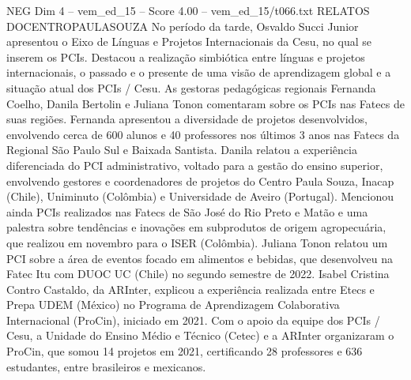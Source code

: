 \begin{textsample}{NEG Dim 4 – vem\_ed\_15 – Score 4.00 – vem\_ed\_15/t066.txt}  \label{ex:f4_neg_054}
RELATOS DOCENTROPAULASOUZA No período da tarde, Osvaldo Succi Junior apresentou o Eixo de Línguas e Projetos Internacionais da Cesu, no qual se inserem os PCIs.
Destacou a realização simbiótica entre línguas e projetos internacionais, o passado e o presente de uma visão de aprendizagem global e a situação atual dos PCIs / Cesu.
As gestoras pedagógicas regionais Fernanda Coelho, Danila Bertolin e Juliana Tonon comentaram sobre os PCIs nas Fatecs de suas regiões.
Fernanda apresentou a diversidade de projetos desenvolvidos, envolvendo cerca de 600 alunos e 40 professores nos últimos 3 anos nas Fatecs da Regional São Paulo Sul e Baixada Santista.
Danila relatou a experiência diferenciada do PCI administrativo, voltado para a gestão do ensino superior, envolvendo gestores e coordenadores de projetos do Centro Paula Souza, Inacap (Chile), Uniminuto (Colômbia) e Universidade de Aveiro (Portugal).
Mencionou ainda PCIs realizados nas Fatecs de São José do Rio Preto e Matão e uma palestra sobre tendências e inovações em subprodutos de origem agropecuária, que realizou em novembro para o ISER (Colômbia).
Juliana Tonon relatou um PCI sobre a área de eventos focado em alimentos e bebidas, que desenvolveu na Fatec Itu com DUOC UC (Chile) no segundo semestre de 2022.
Isabel Cristina Contro Castaldo, da ARInter, explicou a experiência realizada entre Etecs e Prepa UDEM (México) no Programa de Aprendizagem Colaborativa Internacional (ProCin), iniciado em 2021.
Com o apoio da equipe dos PCIs / Cesu, a Unidade do Ensino Médio e Técnico (Cetec) e a ARInter organizaram o ProCin, que somou 14 projetos em 2021, certificando 28 professores e 636 estudantes, entre brasileiros e mexicanos.

\end{textsample}
